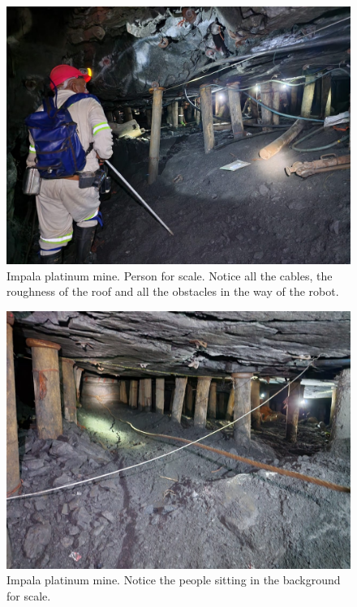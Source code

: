 	\begin{figure}[H]
		\centering
		\includegraphics[width=0.7\linewidth]{Images/Impala4}
		\caption{Impala platinum mine. Person for scale. Notice all the cables, the roughness of the roof and all the obstacles in the way of the robot.}
		\label{fig:Impala4}
	\end{figure}
	
	\begin{figure}[H]
		\centering
		\includegraphics[width=0.7\linewidth]{Images/Impala5}
		\caption{Impala platinum mine. Notice the people sitting in the background for scale. }
		\label{fig:Impala5}
	\end{figure}
	
